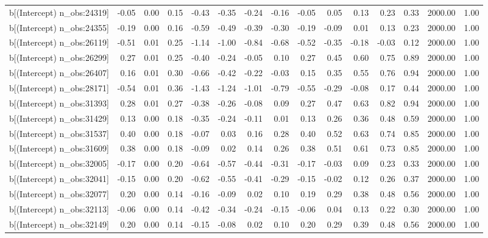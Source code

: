 \begin{table}[ht]
\begin{tabular}{rrrrrrrrrrrrrrr}
  b[(Intercept) n\_obs:24319] & -0.05 & 0.00 & 0.15 & -0.43 & -0.35 & -0.24 & -0.16 & -0.05 & 0.05 & 0.13 & 0.23 & 0.33 & 2000.00 & 1.00 \\ 
  b[(Intercept) n\_obs:24355] & -0.19 & 0.00 & 0.16 & -0.59 & -0.49 & -0.39 & -0.30 & -0.19 & -0.09 & 0.01 & 0.13 & 0.23 & 2000.00 & 1.00 \\ 
  b[(Intercept) n\_obs:26119] & -0.51 & 0.01 & 0.25 & -1.14 & -1.00 & -0.84 & -0.68 & -0.52 & -0.35 & -0.18 & -0.03 & 0.12 & 2000.00 & 1.00 \\ 
  b[(Intercept) n\_obs:26299] & 0.27 & 0.01 & 0.25 & -0.40 & -0.24 & -0.05 & 0.10 & 0.27 & 0.45 & 0.60 & 0.75 & 0.89 & 2000.00 & 1.00 \\ 
  b[(Intercept) n\_obs:26407] & 0.16 & 0.01 & 0.30 & -0.66 & -0.42 & -0.22 & -0.03 & 0.15 & 0.35 & 0.55 & 0.76 & 0.94 & 2000.00 & 1.00 \\ 
  b[(Intercept) n\_obs:28171] & -0.54 & 0.01 & 0.36 & -1.43 & -1.24 & -1.01 & -0.79 & -0.55 & -0.29 & -0.08 & 0.17 & 0.44 & 2000.00 & 1.00 \\ 
  b[(Intercept) n\_obs:31393] & 0.28 & 0.01 & 0.27 & -0.38 & -0.26 & -0.08 & 0.09 & 0.27 & 0.47 & 0.63 & 0.82 & 0.94 & 2000.00 & 1.00 \\ 
  b[(Intercept) n\_obs:31429] & 0.13 & 0.00 & 0.18 & -0.35 & -0.24 & -0.11 & 0.01 & 0.13 & 0.26 & 0.36 & 0.48 & 0.59 & 2000.00 & 1.00 \\ 
  b[(Intercept) n\_obs:31537] & 0.40 & 0.00 & 0.18 & -0.07 & 0.03 & 0.16 & 0.28 & 0.40 & 0.52 & 0.63 & 0.74 & 0.85 & 2000.00 & 1.00 \\ 
  b[(Intercept) n\_obs:31609] & 0.38 & 0.00 & 0.18 & -0.09 & 0.02 & 0.14 & 0.26 & 0.38 & 0.51 & 0.61 & 0.73 & 0.85 & 2000.00 & 1.00 \\ 
  b[(Intercept) n\_obs:32005] & -0.17 & 0.00 & 0.20 & -0.64 & -0.57 & -0.44 & -0.31 & -0.17 & -0.03 & 0.09 & 0.23 & 0.33 & 2000.00 & 1.00 \\ 
  b[(Intercept) n\_obs:32041] & -0.15 & 0.00 & 0.20 & -0.62 & -0.55 & -0.41 & -0.29 & -0.15 & -0.02 & 0.12 & 0.26 & 0.37 & 2000.00 & 1.00 \\ 
  b[(Intercept) n\_obs:32077] & 0.20 & 0.00 & 0.14 & -0.16 & -0.09 & 0.02 & 0.10 & 0.19 & 0.29 & 0.38 & 0.48 & 0.56 & 2000.00 & 1.00 \\ 
  b[(Intercept) n\_obs:32113] & -0.06 & 0.00 & 0.14 & -0.42 & -0.34 & -0.24 & -0.15 & -0.06 & 0.04 & 0.13 & 0.22 & 0.30 & 2000.00 & 1.00 \\ 
  b[(Intercept) n\_obs:32149] & 0.20 & 0.00 & 0.14 & -0.15 & -0.08 & 0.02 & 0.10 & 0.20 & 0.29 & 0.39 & 0.48 & 0.56 & 2000.00 & 1.00 \\ 

\end{tabular}
\end{table}

